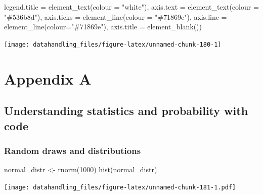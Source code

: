 \documentclass[
  12pt,
]{style/krantz}
\newenvironment{Shaded}{\begin{snugshade}}{\end{snugshade}}
\newcommand{\AttributeTok}[1]{\textcolor[rgb]{0.77,0.63,0.00}{#1}}
\newcommand{\DecValTok}[1]{\textcolor[rgb]{0.00,0.00,0.81}{#1}}
\newcommand{\FunctionTok}[1]{\textcolor[rgb]{0.00,0.00,0.00}{#1}}
\newcommand{\NormalTok}[1]{#1}
\newcommand{\OtherTok}[1]{\textcolor[rgb]{0.56,0.35,0.01}{#1}}
\newcommand{\StringTok}[1]{\textcolor[rgb]{0.31,0.60,0.02}{#1}}
\begin{document}
\begin{Shaded}
\begin{Highlighting}[]
        \AttributeTok{legend.title =} \FunctionTok{element\_text}\NormalTok{(}\AttributeTok{colour =} \StringTok{"white"}\NormalTok{),}
        \AttributeTok{axis.text =} \FunctionTok{element\_text}\NormalTok{(}\AttributeTok{colour =} \StringTok{"\#536b8d"}\NormalTok{),}
        \AttributeTok{axis.ticks =} \FunctionTok{element\_line}\NormalTok{(}\AttributeTok{colour =} \StringTok{"\#71869e"}\NormalTok{),}
        \AttributeTok{axis.line =} \FunctionTok{element\_line}\NormalTok{(}\AttributeTok{colour=}\StringTok{"\#71869e"}\NormalTok{),}
        \AttributeTok{axis.title =} \FunctionTok{element\_blank}\NormalTok{())}
\end{Highlighting}
\end{Shaded}

\texttt{[image: datahandling\_files/figure-latex/unnamed-chunk-180-1]}

\backmatter

\hypertarget{appendix-appendix}{%
\appendix {}}


\hypertarget{appendix-a}{%
\chapter{Appendix A}\label{appendix-a}}

\hypertarget{understanding-statistics-and-probability-with-code}{%
\section{Understanding statistics and probability with code}\label{understanding-statistics-and-probability-with-code}}

\hypertarget{random-draws-and-distributions}{%
\subsection{Random draws and distributions}\label{random-draws-and-distributions}}

\begin{Shaded}
\begin{Highlighting}[]
\NormalTok{normal\_distr }\OtherTok{\textless{}{-}} \FunctionTok{rnorm}\NormalTok{(}\DecValTok{1000}\NormalTok{)}
\FunctionTok{hist}\NormalTok{(normal\_distr)}
\end{Highlighting}
\end{Shaded}

\texttt{[image: datahandling\_files/figure-latex/unnamed-chunk-181-1.pdf]}
\end{document}
